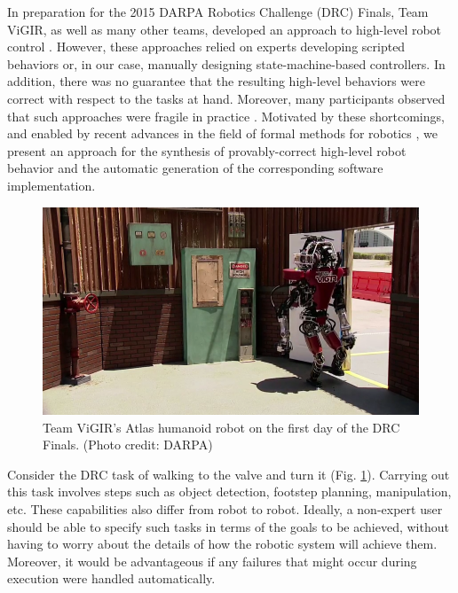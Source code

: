 
In preparation for the 2015 DARPA Robotics Challenge (DRC) Finals, Team ViGIR, as well as many other teams, developed an approach to high-level robot control \cite{Philipp2013Bsc, Philipp2015MSc}.
However, these approaches relied on experts developing scripted behaviors or, in our case, manually designing state-machine-based controllers.
In addition, there was no guarantee that the resulting high-level behaviors were correct with respect to the tasks at hand.
Moreover, many participants observed that such approaches were fragile in practice \cite{DRC-what-happened}.
Motivated by these shortcomings, and enabled by recent advances in the field of formal methods for robotics \cite{Vasu2013ICRA, Vasu2015TRO, JFRKG2012ICRA, Lignos2015AURO, Kavraki2015AAAI, Fainekos2014ICRA, Dimos2014ICRA, Jon2015ICRA, Ben2015IJRR, Wolff2014ICRA, Belta2014TAC, Ankur2015ISRR, Finucane2010IROS, Topcu2011RAM, Kavraki2015ICRA},
we present an approach for the synthesis of provably-correct high-level robot behavior and the 
automatic generation of the corresponding software implementation.

\begin{figure}[t]
\centering
\includegraphics[width=0.99\columnwidth,clip]{./img/atlas_door_finals.png}
\caption{Team ViGIR's Atlas humanoid robot on the first day of the DRC Finals. (Photo credit: DARPA)
}
\label{Fig:AtlasDoorFinals}
\end{figure}

\begin{myExample}\label{Ex:PickupObject}
	Consider the DRC task of walking to the valve and turn it (Fig. \ref{Fig:AtlasDoorFinals}).
	Carrying out this task involves steps such as object detection, footstep planning, manipulation, etc.
	These capabilities also differ from robot to robot.
	Ideally, a non-expert user should be able to specify such tasks in terms of the goals to be achieved, without having to worry about the details of how the robotic system will achieve them.
	Moreover, it would be advantageous if any failures that might occur during execution were handled automatically.
\end{myExample}

